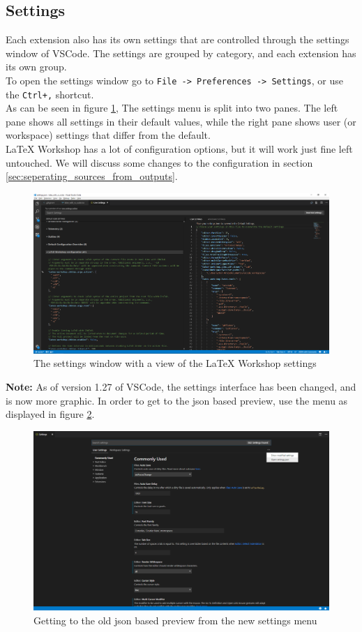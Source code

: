 \documentclass{article}
\newcommand{\latex}{\LaTeX\xspace}
\begin{document}
\subsection{Settings}
Each extension also has its own settings that are controlled through the settings window of VSCode. The settings are grouped by category, and each extension has its own group.\\
To open the settings window go to \texttt{File -> Preferences -> Settings}, or use the \texttt{Ctrl+,} shortcut.\\
As can be seen in figure \ref{fig:settings_window}, The settings menu is split into two panes. The left pane shows all settings in their default values, while the right pane shows user (or workspace) settings that differ from the default.\\
\latex Workshop has a lot of configuration options, but it will work just fine left untouched. We will discuss some changes to the configuration in section \ref{sec:seperating_sources_from_outputs}.\\
\begin{figure}
	\includegraphics[width=\linewidth]{../resources/settings_window.png}
	\caption{The settings window with a view of the \latex Workshop settings}
	\label{fig:settings_window}
\end{figure}
\textbf{Note:} As of version 1.27 of VSCode, the settings interface has been changed, and is now more graphic. In order to get to the json based preview, use the menu as displayed in figure \ref{fig:v1_27_settings}.
\begin{figure}[h!]
	\includegraphics[width=\linewidth]{../resources/v1_27_settings.png}
	\caption{Getting to the old json based preview from the new settings menu}
	\label{fig:v1_27_settings}
\end{figure}
\end{document}
